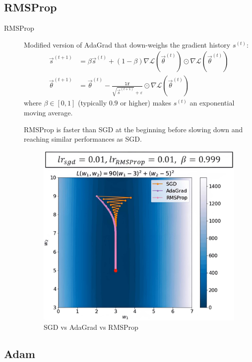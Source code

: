 \subsection{RMSProp}

\begin{description}
    \item[RMSProp] 
        Modified version of AdaGrad that down-weighs the gradient history $s^{(t)}$:
        \[
            \begin{split}
                \vec{s}^{(t+1)} &= \beta \vec{s}^{(t)} + (1-\beta) \nabla\mathcal{L}(\vec{\theta}^{(t)}) \odot \nabla\mathcal{L}(\vec{\theta}^{(t)}) \\
                \vec{\theta}^{(t+1)} &= \vec{\theta}^{(t)} - \frac{\texttt{lr}}{\sqrt{\vec{s}^{(t+1)}} + \varepsilon} \odot \nabla\mathcal{L}(\vec{\theta}^{(t)})
            \end{split}
        \]
        where $\beta \in [0, 1]$ (typically $0.9$ or higher) makes $s^{(t)}$ an exponential moving average.

        \begin{remark}
            RMSProp is faster than SGD at the beginning before slowing down and reaching similar performances as SGD.
        \end{remark}

        \begin{figure}[H]
            \centering
            \includegraphics[width=0.35\linewidth]{./img/rmsprop.jpg}
            \caption{SGD vs AdaGrad vs RMSProp}
        \end{figure}
\end{description}


\subsection{Adam}

